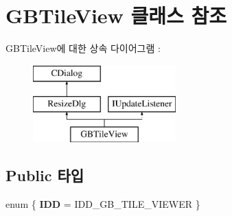 \hypertarget{class_g_b_tile_view}{}\section{G\+B\+Tile\+View 클래스 참조}
\label{class_g_b_tile_view}
G\+B\+Tile\+View에 대한 상속 다이어그램 \+: \begin{figure}[H]
\begin{center}
\leavevmode
\includegraphics[height=3.000000cm]{class_g_b_tile_view}
\end{center}
\end{figure}
\subsection*{Public 타입}
\begin{DoxyCompactItemize}
\item 
\mbox{\label{class_g_b_tile_view_a827f593cb0979d00c2e51aab7eecc619}} 
enum \{ {\bfseries I\+DD} = I\+D\+D\+\_\+\+G\+B\+\_\+\+T\+I\+L\+E\+\_\+\+V\+I\+E\+W\+ER
 \}
\end{DoxyCompactItemize}
